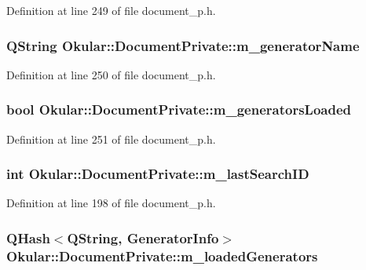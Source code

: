 Definition at line 249 of file document\+\_\+p.\+h.

\hypertarget{classOkular_1_1DocumentPrivate_a4f02c151d836f43f47a6eeb614b25bf0}{
\subsubsection[{m\+\_\+generator\+Name}]{\setlength{\rightskip}{0pt plus 5cm}Q\+String Okular\+::\+Document\+Private\+::m\+\_\+generator\+Name}}\label{classOkular_1_1DocumentPrivate_a4f02c151d836f43f47a6eeb614b25bf0}


Definition at line 250 of file document\+\_\+p.\+h.

\hypertarget{classOkular_1_1DocumentPrivate_a443010c7211e13e1589b1124a9147dd0}{
\subsubsection[{m\+\_\+generators\+Loaded}]{\setlength{\rightskip}{0pt plus 5cm}bool Okular\+::\+Document\+Private\+::m\+\_\+generators\+Loaded}}\label{classOkular_1_1DocumentPrivate_a443010c7211e13e1589b1124a9147dd0}


Definition at line 251 of file document\+\_\+p.\+h.

\hypertarget{classOkular_1_1DocumentPrivate_a83278116cf6b0e38d834c8e416e17de6}{
\subsubsection[{m\+\_\+last\+Search\+I\+D}]{\setlength{\rightskip}{0pt plus 5cm}int Okular\+::\+Document\+Private\+::m\+\_\+last\+Search\+I\+D}}\label{classOkular_1_1DocumentPrivate_a83278116cf6b0e38d834c8e416e17de6}


Definition at line 198 of file document\+\_\+p.\+h.

\hypertarget{classOkular_1_1DocumentPrivate_a449d3ae52e95d649dba62225f20a4195}{
\subsubsection[{m\+\_\+loaded\+Generators}]{\setlength{\rightskip}{0pt plus 5cm}Q\+Hash$<$Q\+String, {\bf Generator\+Info}$>$ Okular\+::\+Document\+Private\+::m\+\_\+loaded\+Generators}}\label{classOkular_1_1DocumentPrivate_a449d3ae52e95d649dba62225f20a4195}



